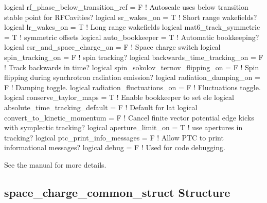 {{{{{{{{\begin{example}
    logical rf_phase_below_transition_ref = F   ! Autoscale uses below transition stable point for RFCavities?
    logical sr_wakes_on = T                     ! Short range wakefields?
    logical lr_wakes_on = T                     ! Long range wakefields
    logical mat6_track_symmetric = T            ! symmetric offsets
    logical auto_bookkeeper = T                 ! Automatic bookkeeping?
    logical csr_and_space_charge_on = F         ! Space charge switch
    logical spin_tracking_on = F                ! spin tracking?
    logical backwards_time_tracking_on = F      ! Track backwards in time?
    logical spin_sokolov_ternov_flipping_on = F ! Spin flipping during synchrotron radiation emission?
    logical radiation_damping_on = F            ! Damping toggle.
    logical radiation_fluctuations_on = F       ! Fluctuations toggle.
    logical conserve_taylor_maps = T            ! Enable bookkeeper to set ele%
    logical absolute_time_tracking_default = F  ! Default for lat%
    logical convert_to_kinetic_momentum = F     ! Cancel finite vector potential edge kicks with symplectic tracking?
    logical aperture_limit_on = T               ! use apertures in tracking?
    logical ptc_print_info_messages = F         ! Allow PTC to print informational messages?
    logical debug = F                           ! Used for code debugging.
\end{example}
See the \bmad manual for more details.

\subsection{space\_charge\_common\_struct Structure}
\label{s:csr.param.struct} 

}}}}}}}}
